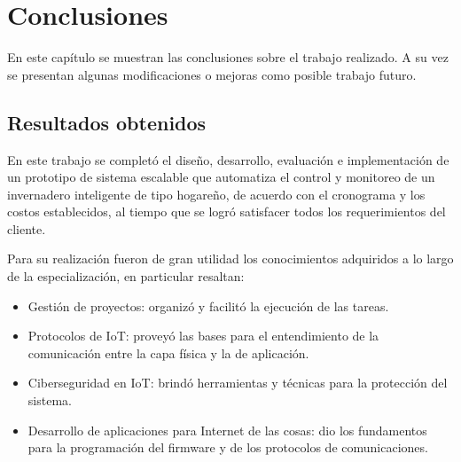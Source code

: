 
\chapter{Conclusiones} %

\label{Chapter5} %





En este capítulo se muestran las conclusiones sobre el trabajo realizado. A su vez
se presentan algunas modificaciones o mejoras como posible trabajo futuro.
\section{Resultados obtenidos }


En este trabajo se completó el diseño, desarrollo, evaluación e implementación de un
prototipo de sistema escalable que automatiza el control y monitoreo de un invernadero inteligente de tipo hogareño, de acuerdo con el cronograma y los costos establecidos, al tiempo que se logró satisfacer todos los requerimientos del cliente.

Para su realización fueron de gran utilidad los conocimientos adquiridos a lo largo de la especialización, en particular resaltan:
\begin{itemize}
\item Gestión de proyectos: organizó y facilitó la ejecución de las tareas.
\item Protocolos de IoT: proveyó las bases para el entendimiento de la comunicación entre la capa física y la de aplicación.
\item Ciberseguridad en IoT: brindó herramientas y técnicas para la protección del sistema.
\item Desarrollo de aplicaciones para Internet de las cosas: dio los fundamentos para la programación del firmware y de los protocolos de comunicaciones. 
\end{itemize}



